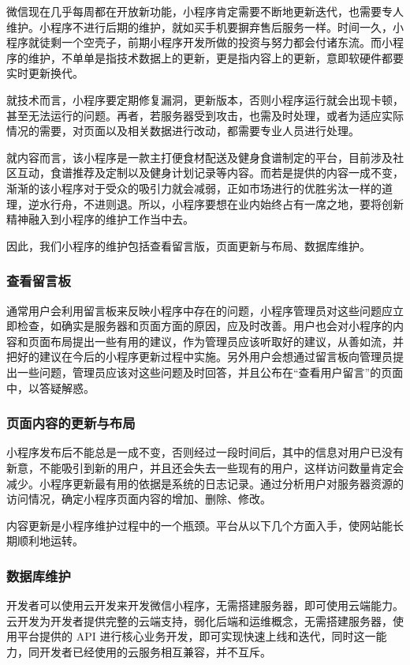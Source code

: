\documentclass[UTF8,12pt]{ctexart}
\numberwithin{figure}{section}%
\begin{document}
\begin{spacing}{2}
微信现在几乎每周都在开放新功能，小程序肯定需要不断地更新迭代，也需要专人维护。小程序不进行后期的维护，就如买手机要摒弃售后服务一样。时间一久，小程序就徒剩一个空壳子，前期小程序开发所做的投资与努力都会付诸东流。而小程序的维护，不单单是指技术数据上的更新，更是指内容上的更新，意即软硬件都要实时更新换代。

就技术而言，小程序要定期修复漏洞，更新版本，否则小程序运行就会出现卡顿，甚至无法运行的问题。再者，若服务器受到攻击，也需及时处理，或者为适应实际情况的需要，对页面以及相关数据进行改动，都需要专业人员进行处理。

就内容而言，该小程序是一款主打便食材配送及健身食谱制定的平台，目前涉及社区互动，食谱推荐及定制以及健身计划记录等内容。而若是提供的内容一成不变，渐渐的该小程序对于受众的吸引力就会减弱，正如市场进行的优胜劣汰一样的道理，逆水行舟，不进则退。所以，小程序要想在业内始终占有一席之地，要将创新精神融入到小程序的维护工作当中去。

因此，我们小程序的维护包括查看留言版，页面更新与布局、数据库维护。


\subsubsection{查看留言板}
通常用户会利用留言板来反映小程序中存在的问题，小程序管理员对这些问题应立即检查，如确实是服务器和页面方面的原因，应及时改善。用户也会对小程序的内容和页面布局提出一些有用的建议，作为管理员应该听取好的建议，从善如流，并把好的建议在今后的小程序更新过程中实施。另外用户会想通过留言板向管理员提出一些问题，管理员应该对这些问题及时回答，并且公布在“查看用户留言”的页面中，以答疑解惑。

\subsubsection{页面内容的更新与布局}
小程序发布后不能总是一成不变，否则经过一段时间后，其中的信息对用户已没有新意，不能吸引到新的用户，并且还会失去一些现有的用户，这样访问数量肯定会减少。小程序更新最有用的依据是系统的日志记录。通过分析用户对服务器资源的访问情况，确定小程序页面内容的增加、删除、修改。

内容更新是小程序维护过程中的一个瓶颈。平台从以下几个方面入手，使网站能长期顺利地运转。

\subsubsection{数据库维护}
开发者可以使用云开发来开发微信小程序，无需搭建服务器，即可使用云端能力。云开发为开发者提供完整的云端支持，弱化后端和运维概念，无需搭建服务器，使用平台提供的 API 进行核心业务开发，即可实现快速上线和迭代，同时这一能力，同开发者已经使用的云服务相互兼容，并不互斥。


\end{spacing}
\end{document}
